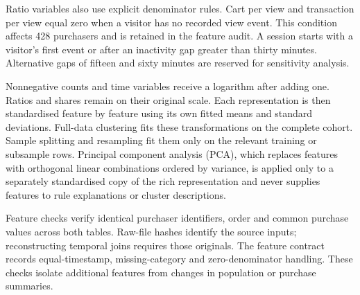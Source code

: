Ratio variables also use explicit denominator rules. Cart per view and transaction per view equal zero when a visitor has no recorded view event. This condition affects 428 purchasers and is retained in the feature audit. A session starts with a visitor's first event or after an inactivity gap greater than thirty minutes. Alternative gaps of fifteen and sixty minutes are reserved for sensitivity analysis.

Nonnegative counts and time variables receive a logarithm after adding one. Ratios and shares remain on their original scale. Each representation is then standardised feature by feature using its own fitted means and standard deviations. Full-data clustering fits these transformations on the complete cohort. Sample splitting and resampling fit them only on the relevant training or subsample rows. Principal component analysis (PCA), which replaces features with orthogonal linear combinations ordered by variance, is applied only to a separately standardised copy of the rich representation and never supplies features to rule explanations or cluster descriptions.

Feature checks verify identical purchaser identifiers, order and common purchase values across both tables. Raw-file hashes identify the source inputs; reconstructing temporal joins requires those originals. The feature contract records equal-timestamp, missing-category and zero-denominator handling. These checks isolate additional features from changes in population or purchase summaries.
